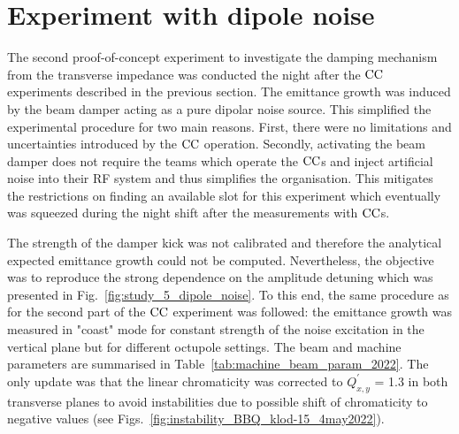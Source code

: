 



\section{Experiment with dipole noise}\label{sec:coast_md_damper_2022}
The second proof-of-concept experiment to investigate the damping mechanism from the transverse impedance was conducted the night after the ${\mathrm{CC}}$ experiments described in the previous section. The emittance growth was induced by the beam damper acting as a pure dipolar noise source. This simplified the experimental procedure for two main reasons. First, there were no limitations and uncertainties introduced by the ${\mathrm{CC}}$ operation. Secondly, activating the beam damper does not require the teams which operate the ${\mathrm{CC}}$s and inject artificial noise into their RF system and thus simplifies the organisation. This mitigates the restrictions on finding an available slot for this experiment which eventually was squeezed during the night shift after the measurements with ${\mathrm{CC}}$s. %

The strength of the damper kick was not calibrated and therefore the analytical expected emittance growth could not be computed. Nevertheless, the objective was to reproduce the strong dependence on the amplitude detuning which was presented in Fig.~\ref{fig:study_5_dipole_noise}. To this end, the same procedure as for the second part of the ${\mathrm{CC}}$ experiment was followed: the emittance growth was measured in "coast" mode for constant strength of the noise excitation in the vertical plane but for different octupole settings. The beam and machine parameters are summarised in Table~\ref{tab:machine_beam_param_2022}. The only update was that the linear chromaticity was corrected to $Q^\prime_{x,y}$ = 1.3 in both transverse planes to avoid instabilities due to possible shift of chromaticity to negative values (see Figs.~\ref{fig:instability_BBQ_klod-15_4may2022}).%


